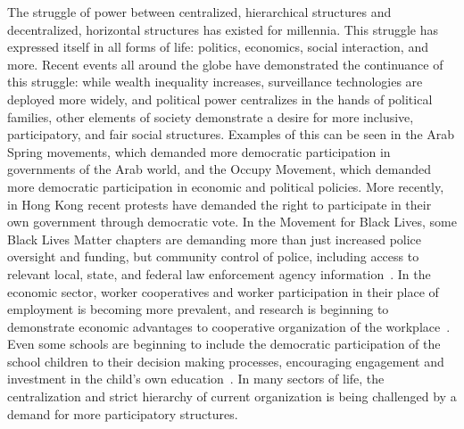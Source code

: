 The struggle of power between centralized, hierarchical structures and
decentralized, horizontal structures has existed for millennia. This struggle
has expressed itself in all forms of life: politics, economics, social
interaction, and more. Recent events all around the globe have demonstrated the
continuance of this struggle: while wealth inequality increases, surveillance
technologies are deployed more widely, and political power centralizes in the
hands of political families, other elements of society demonstrate a desire for
more inclusive, participatory, and fair social structures. Examples of this can
be seen in the Arab Spring movements, which demanded more democratic
participation in governments of the Arab world, and the Occupy Movement, which
demanded more democratic participation in economic and political policies. More
recently, in Hong Kong recent protests have demanded the right to participate in
their own government through democratic vote. In the Movement for Black Lives,
some Black Lives Matter chapters are demanding more than just increased police
oversight and funding, but community control of police, including access to
relevant local, state, and federal law enforcement agency
information~\cite{m4blpolicyreforms}. In the economic sector, worker
cooperatives and worker participation in their place of employment is becoming
more prevalent, and research is beginning to demonstrate economic advantages to
cooperative organization of the
workplace~\cite{jackall19846,wright2014worker, lindenfeld1982workplace}.
Even some schools are beginning to include the democratic participation of the
school children to their decision making processes, encouraging engagement and
investment in the child's own education~\cite{pacheco2008escola}. In many
sectors of life, the centralization and strict hierarchy of current organization
is being challenged by a demand for more participatory structures.

